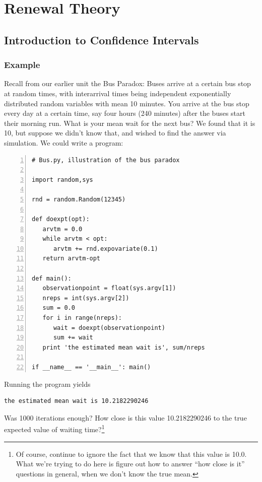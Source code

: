 \chapter{Renewal Theory}
\label{ren}

\section{Introduction to Confidence Intervals}

\subsection{Example}

\label{bus}

Recall from our earlier unit the Bus Paradox:  Buses arrive at a certain
bus stop at random times, with interarrival times being independent
exponentially distributed random variables with mean 10 minutes.  You
arrive at the bus stop every day at a certain time, say four hours (240
minutes) after the buses start their morning run.  What is your mean
wait for the next bus?  We found that it is 10, but suppose we didn't
know that, and wished to find the answer via simulation.  We could write
a program:

\begin{Verbatim}[fontsize=\relsize{-2},numbers=left]
# Bus.py, illustration of the bus paradox

import random,sys

rnd = random.Random(12345)

def doexpt(opt):
   arvtm = 0.0
   while arvtm < opt:
      arvtm += rnd.expovariate(0.1)
   return arvtm-opt

def main():
   observationpoint = float(sys.argv[1])
   nreps = int(sys.argv[2])
   sum = 0.0
   for i in range(nreps):
      wait = doexpt(observationpoint)
      sum += wait
   print 'the estimated mean wait is', sum/nreps

if __name__ == '__main__': main()
\end{Verbatim}

Running the program yields

\begin{Verbatim}[fontsize=\relsize{-2}]
% python Bus.py 240 1000
the estimated mean wait is 10.2182290246
\end{Verbatim}

Was 1000 iterations enough?  How close is this value 10.2182290246 to
the true expected value of waiting time?\footnote{Of course, continue to
ignore the fact that we know that this value is 10.0.  What we're trying
to do here is figure out how to answer ``how close is it'' questions 
in general, when we don't know the true mean.}

